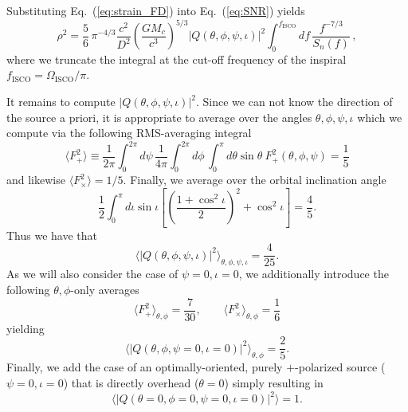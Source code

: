 \documentclass[11pt,a4paper]{article}
\newcommand{\f}{\frac}
\newcommand{\be}{\begin{equation}}
\newcommand{\ee}{\end{equation}}
\begin{document}
Substituting Eq.~(\ref{eq:strain_FD}) into Eq.~(\ref{eq:SNR}) yields
%
\be
\rho^2 = \f{5}{6}\, \pi^{-4/3} \f{c^2}{D^2}\left(\f{G M_c}{c^3}\right)^{5/3}|Q(\theta,\phi,\psi,\iota)|^2 \int_0^{f_\text{ISCO}} d f\, \f{f^{-7/3}}{S_n(f)}\, \label{eq:SNR_v2},
\ee
%
where we truncate the integral at the cut-off frequency of the inspiral $f_\text{ISCO}=\Omega_\text{ISCO}/\pi$.

It remains to compute $|Q(\theta,\phi,\psi,\iota)|^2$. 
Since we can not know the direction of the source a priori, it is appropriate to average over the angles $\theta,\phi,\psi,\iota$ which we compute
%
%
via the following RMS-averaging integral
%
\be
\langle F^2_{+}\rangle \equiv \f{1}{2\pi}\int_0^{2\pi}d\psi \,\f{1}{4\pi}\int_0^{2\pi} d\phi\,\int_0^\pi d\theta \sin\theta\ F^2_{+}(\theta,\phi,\psi)=\f{1}{5}\label{eq:ang_av}
\ee
%
and likewise $\langle F^2_{\times}\rangle=1/5 $.
Finally, we average over the orbital inclination angle
%
\be
\f{1}{2} \int_0^\pi d\iota\sin\iota\left[\left(\f{1+\cos^2\iota}{2}\right)^2+\cos^2\iota\right] = \f{4}{5} .\label{eq:inc_ang_av}
\ee
Thus we have that
%
\be
\langle |Q(\theta,\phi,\psi,\iota)|^2 \rangle_{\theta,\phi,\psi,\iota} = \f{4}{25}\label{eq:RMS_th_ph_ps_iota}.
\ee
%
As we will also consider the case of $\psi=0,\iota=0$, we additionally introduce the following $\theta,\phi$-only averages
%
\be
 \langle F_+^2\rangle_{\theta,\phi} = \frac{7}{30},\qquad \langle F_\times^2\rangle_{\theta,\phi} = \frac{1}{6}
\ee
yielding
%
\be
\langle |Q(\theta,\phi,\psi=0,\iota=0)|^2 \rangle_{\theta,\phi} = \f{2}{5} \label{eq:RMS_th_phi}.
\ee
Finally, we add the case of an optimally-oriented, purely $+$-polarized source ($\psi=0,\iota=0$) that is directly overhead ($\theta=0$) simply resulting in 
%
\be
\langle |Q(\theta=0,\phi=0,\psi=0,\iota=0)|^2 \rangle = 1.
\ee
%
%
%
%

\end{document}

